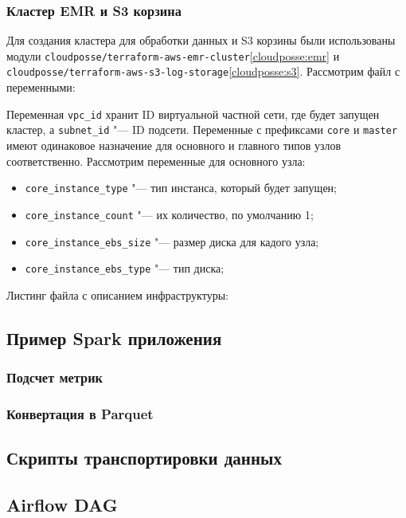 \documentclass[bachelor, och, pract]{SCWorks}
\begin{document}
\subsubsection{Кластер EMR и S3 корзина}
Для создания кластера для обработки данных и S3 корзины были использованы модули \verb|cloudposse/terraform-aws-emr-cluster|\ref{cloudposse:emr} и \verb|cloudposse/terraform-aws-s3-log-storage|\ref{cloudposse:s3}. 
Рассмотрим файл с переменными:


Переменная \verb|vpc_id| хранит ID виртуальной частной сети, где будет запущен кластер, а \verb|subnet_id| "--- ID подсети. Переменные с префиксами \verb|core| и \verb|master| имеют одинаковое назначение для основного и главного типов узлов соответственно. Рассмотрим переменные для основного узла:
\begin{itemize}
	\item \verb|core_instance_type| "--- тип инстанса, который будет запущен;
	\item \verb|core_instance_count| "--- их количество, по умолчанию 1;
	\item \verb|core_instance_ebs_size| "--- размер диска для кадого узла;
	\item \verb|core_instance_ebs_type| "--- тип диска;
\end{itemize}

Листинг файла с описанием инфраструктуры:



\subsection{Пример Spark приложения}
\subsubsection{Подсчет метрик}
\subsubsection{Конвертация в Parquet}
\subsection{Скрипты транспортировки данных}
\subsection{Airflow DAG}
\end{document}
